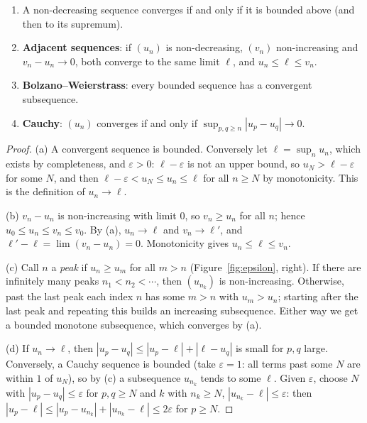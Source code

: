 \begin{proposition}\label{prop:seqcrit}
\begin{enumerate}[label=(\alph*)]
\item A non-decreasing sequence converges if and only if it is bounded above (and then to its supremum).
\item \textbf{Adjacent sequences}: if $(u_n)$ is non-decreasing, $(v_n)$ non-increasing and $v_n-u_n\to0$, both converge to the same limit $\ell$, and $u_n\le\ell\le v_n$.
\item \textbf{Bolzano--Weierstrass}: every bounded sequence has a convergent subsequence.
\item \textbf{Cauchy}: $(u_n)$ converges if and only if $\sup_{p,q\ge n}|u_p-u_q|\to0$.
\end{enumerate}
\end{proposition}
\begin{proof}
(a) A convergent sequence is bounded. Conversely let $\ell=\sup_nu_n$, which exists by completeness, and $\varepsilon>0$: $\ell-\varepsilon$ is not an upper bound, so $u_N>\ell-\varepsilon$ for some $N$, and then $\ell-\varepsilon<u_N\le u_n\le\ell$ for all $n\ge N$ by monotonicity. This is the definition of $u_n\to\ell$.

(b) $v_n-u_n$ is non-increasing with limit $0$, so $v_n\ge u_n$ for all $n$; hence $u_0\le u_n\le v_n\le v_0$. By (a), $u_n\to\ell$ and $v_n\to\ell'$, and $\ell'-\ell=\lim(v_n-u_n)=0$. Monotonicity gives $u_n\le\ell\le v_n$.

(c) Call $n$ a \emph{peak} if $u_n\ge u_m$ for all $m>n$ (Figure~\ref{fig:epsilon}, right). If there are infinitely many peaks $n_1<n_2<\cdots$, then $(u_{n_k})$ is non-increasing. Otherwise, past the last peak each index $n$ has some $m>n$ with $u_m>u_n$; starting after the last peak and repeating this builds an increasing subsequence. Either way we get a bounded monotone subsequence, which converges by (a).

(d) If $u_n\to\ell$, then $|u_p-u_q|\le|u_p-\ell|+|\ell-u_q|$ is small for $p,q$ large. Conversely, a Cauchy sequence is bounded (take $\varepsilon=1$: all terms past some $N$ are within $1$ of $u_N$), so by (c) a subsequence $u_{n_k}$ tends to some $\ell$. Given $\varepsilon$, choose $N$ with $|u_p-u_q|\le\varepsilon$ for $p,q\ge N$ and $k$ with $n_k\ge N$, $|u_{n_k}-\ell|\le\varepsilon$: then $|u_p-\ell|\le|u_p-u_{n_k}|+|u_{n_k}-\ell|\le2\varepsilon$ for $p\ge N$.
\end{proof}

